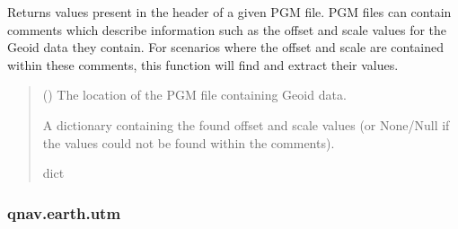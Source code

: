 \documentclass[letterpaper,10pt,english]{sphinxmanual}
\begin{document}

\begin{fulllineitems}
\label{\detokenize{modules/earth/geoid:qnav.earth.geoid.read_pgm_header}}
\pysigstartsignatures
{}
\pysigstopsignatures
\sphinxAtStartPar
Returns values present in the header of a given PGM file.
PGM files can contain comments which describe information such as the
offset and scale values for the Geoid data they contain. For scenarios
where the offset and scale are contained within these comments, this
function will find and extract their values.
\begin{quote}\begin{description}
\sphinxAtStartPar
{} () \textendash{} The location of the PGM file containing Geoid data.

\sphinxAtStartPar
A dictionary containing the found offset and scale values
(or None/Null if the values could not be found within the comments).

\sphinxAtStartPar
dict

\end{description}\end{quote}

\end{fulllineitems}


\sphinxstepscope


\subsubsection{qnav.earth.utm}
\label{\detokenize{modules/earth/utm:module-qnav.earth.utm}}\label{\detokenize{modules/earth/utm:qnav-earth-utm}}\label{\detokenize{modules/earth/utm::doc}}
\end{document}
